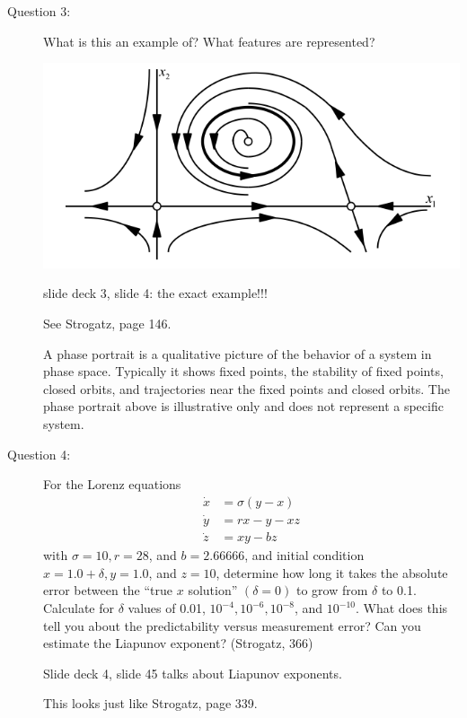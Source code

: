 \documentclass[letterpaper,10pt]{article}
\begin{document}
\begin{description}

\item[Question 3:]
What is this an example of?  What features are represented?
\begin{center}
  \includegraphics[scale=0.65]{images/phaseportrait.png}
\end{center}

slide deck 3, slide 4: the exact example!!!

See Strogatz, page 146.

A phase portrait is a qualitative picture of the behavior of a system in phase space.  Typically it shows fixed points, the stability of fixed points, closed orbits, and trajectories near the fixed points and closed orbits.  The phase portrait above is illustrative only and does not represent a specific system.


\item[Question 4:]
For the Lorenz equations
\begin{align*}
\dot{x} &= \sigma(y-x) \\
\dot{y} &= rx-y-xz \\
\dot{z} &= xy-bz
\end{align*}
with $\sigma=10, r=28$, and $b=2.66666$, and initial condition $x=1.0+\delta, y=1.0$, and $z=10$, determine how long it takes the absolute error between the ``true $x$ solution'' $(\delta=0)$ to grow from $\delta$ to 0.1. Calculate for $\delta$ values of 0.01, $10^{-4}, 10^{-6}, 10^{-8}$, and $10^{-10}$.  What does this tell you about the predictability versus measurement error?  Can you estimate the Liapunov exponent? (Strogatz, 366)

Slide deck 4, slide 45 talks about Liapunov exponents.

This looks just like Strogatz, page 339.


\end{description}
\end{document}
